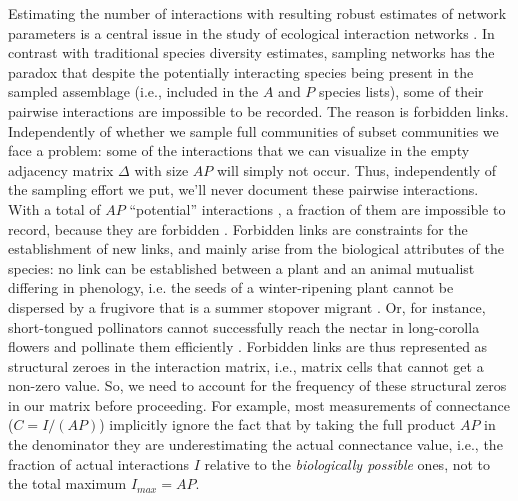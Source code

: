 \documentclass[12pt]{article}
\begin{document}
Estimating the number of interactions with resulting robust estimates of network parameters is a central issue in the study of ecological interaction networks \citep{E31/2562,Bascompte:2014to}. In contrast with traditional species diversity estimates, sampling networks has the paradox that despite the potentially interacting species being present in the sampled assemblage (i.e., included in the $A$ and $P$ species lists), some of their pairwise interactions are impossible to be recorded. The reason is forbidden links. Independently of whether we sample full communities of subset communities we face a problem: some of the interactions that we can visualize in the empty adjacency matrix $\Delta$ with size $AP$ will simply not occur. Thus, independently of the sampling effort we put, we'll never document these pairwise interactions. With a total of $AP$ ``potential'' interactions , a fraction of them are impossible to record, because they are forbidden \citep{E31.7324_PDF,Olesen:2011a}. Forbidden links are constraints for the establishment of new links, and mainly arise from the biological attributes of the species: no link can be established between a plant and an animal mutualist differing in phenology, i.e. the seeds of a winter-ripening plant cannot be dispersed by a frugivore that is a summer stopover migrant \citep{E31/2562}. Or, for instance, short-tongued pollinators cannot successfully reach the nectar in long-corolla flowers and pollinate them efficiently \citep{More:2012kx}. Forbidden links are thus represented as structural zeroes in the interaction matrix, i.e., matrix cells that cannot get a non-zero value. So, we need to account for the frequency of these structural zeros in our matrix before proceeding. For example, most measurements of connectance ($C= I/(AP)$) implicitly ignore the fact that by taking the full product $AP$ in the denominator they are underestimating the actual connectance value, i.e., the fraction of actual interactions $I$ relative to the \emph{biologically possible} ones, not to the total maximum $I_{max}= AP$. 

\end{document}
